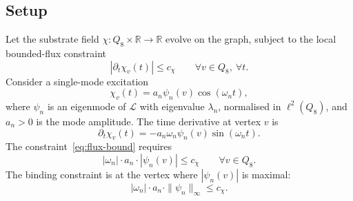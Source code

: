 \subsection{Setup}
  \label{subsec:setup}

  Let the substrate field $\chi \colon Q_8 \times \mathbb{R} \to \mathbb{R}$ evolve
  on the graph, subject to the local bounded-flux constraint
  \begin{equation}
    \label{eq:flux-bound}
    |\partial_t \chi_v(t)| \leq c_\chi
    \qquad
    \forall v \in Q_8,
    \ \forall t.
  \end{equation}
  Consider a single-mode excitation
  \begin{equation}
    \chi_v(t) = a_n \psi_n(v) \cos(\omega_n t),
  \end{equation}
  where $\psi_n$ is an eigenmode of $\mathcal{L}$ with eigenvalue $\lambda_n$,
  normalised in $\ell^2(Q_8)$, and $a_n > 0$ is the mode amplitude.
  The time derivative at vertex $v$ is
  \begin{equation}
    \partial_t \chi_v(t) = -a_n \omega_n \psi_n(v) \sin(\omega_n t).
  \end{equation}
  The constraint~\eqref{eq:flux-bound} requires
  \begin{equation}
    |\omega_n| \cdot a_n \cdot |\psi_n(v)| \leq c_\chi
    \qquad
    \forall v \in Q_8.
  \end{equation}
  The binding constraint is at the vertex where $|\psi_n(v)|$ is maximal:
  \begin{equation}
    |\omega_n| \cdot a_n \cdot \|\psi_n\|_\infty \leq c_\chi.
  \end{equation}
